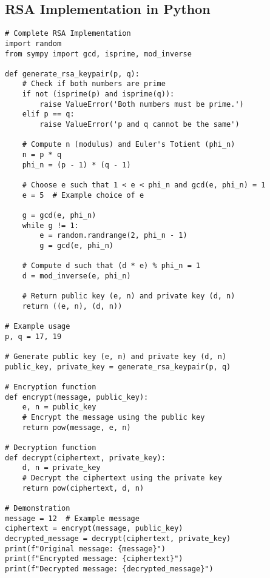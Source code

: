 \documentclass{article}
\begin{document}
\subsection{RSA Implementation in Python}
\begin{lstlisting}
# Complete RSA Implementation
import random
from sympy import gcd, isprime, mod_inverse

def generate_rsa_keypair(p, q):
    # Check if both numbers are prime
    if not (isprime(p) and isprime(q)):
        raise ValueError('Both numbers must be prime.')
    elif p == q:
        raise ValueError('p and q cannot be the same')
    
    # Compute n (modulus) and Euler's Totient (phi_n)
    n = p * q
    phi_n = (p - 1) * (q - 1)

    # Choose e such that 1 < e < phi_n and gcd(e, phi_n) = 1
    e = 5  # Example choice of e

    g = gcd(e, phi_n)
    while g != 1:
        e = random.randrange(2, phi_n - 1)
        g = gcd(e, phi_n)

    # Compute d such that (d * e) % phi_n = 1
    d = mod_inverse(e, phi_n)
    
    # Return public key (e, n) and private key (d, n)
    return ((e, n), (d, n))
    
# Example usage
p, q = 17, 19

# Generate public key (e, n) and private key (d, n)
public_key, private_key = generate_rsa_keypair(p, q)

# Encryption function
def encrypt(message, public_key):
    e, n = public_key
    # Encrypt the message using the public key
    return pow(message, e, n)

# Decryption function
def decrypt(ciphertext, private_key):
    d, n = private_key
    # Decrypt the ciphertext using the private key
    return pow(ciphertext, d, n)

# Demonstration
message = 12  # Example message
ciphertext = encrypt(message, public_key)
decrypted_message = decrypt(ciphertext, private_key)
print(f"Original message: {message}")
print(f"Encrypted message: {ciphertext}")
print(f"Decrypted message: {decrypted_message}")
\end{lstlisting}
\end{document}
